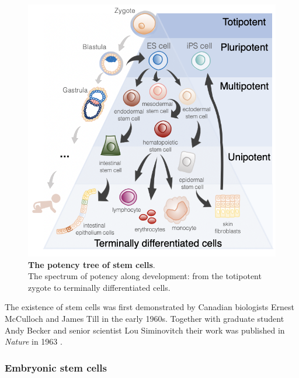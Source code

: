 \begin{figure}[htbp]
\centering
\includegraphics[width=16cm]{Chapter1/Fig/stem_cell_potency.png}
\caption[Stem Cells]{\textbf{The potency tree of stem cells}.\\
The spectrum of potency along development: from the totipotent zygote to terminally differentiated cells. 
}
\label{fig:stem_cells}
\end{figure}

The existence of stem cells was first demonstrated by Canadian biologists Ernest McCulloch and James Till in the early 1960s.
Together with graduate student Andy Becker and senior scientist Lou Siminovitch their work was published in \textit{Nature} in 1963 \cite{becker1963cytological}.

\subsubsection{Embryonic stem cells}

